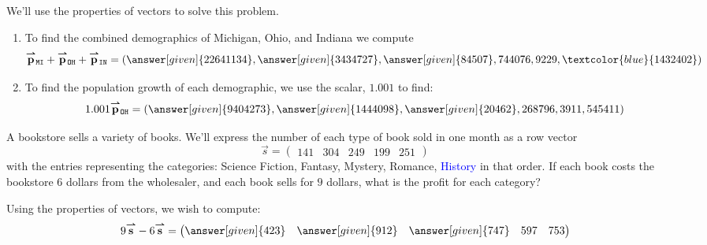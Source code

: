 \documentclass{ximera}
\begin{document}
\begin{example}
\begin{explanation}
  We'll use the properties of vectors to solve this problem.
  \begin{enumerate}
  \item To find the combined demographics of Michigan, Ohio, and
    Indiana we compute
    \[
    \vec{p}_{\texttt{MI}} + \vec{p}_{\texttt{OH}} + \vec{p}_{\texttt{IN}} = \left(\answer[given]{22641134},\answer[given]{3434727},\answer[given]{84507},744076,9229,\textcolor{blue}{1432402}\right)
    \]
  \item To find the population growth of each demographic, we use the scalar, $1.001$ to find:
    \[
    1.001 \vec{p}_{\texttt{OH}} =\left(\answer[given]{9404273},\answer[given]{1444098},\answer[given]{20462},268796,3911,545411 \right)
    \]
  \end{enumerate}
\end{explanation}
\end{example}



\begin{example}
  A bookstore sells a variety of books. We'll express the number of
  each type of book sold in one month as a row vector
  \[
  \vec{s} = \begin{pmatrix}141 & 304 & 249 & 199 & 251 \end{pmatrix}
  \]
  with the entries representing the categories: Science Fiction,
  Fantasy, Mystery, Romance, \textcolor{blue}{History} in that order.  If each book
  costs the bookstore $6$ dollars from the wholesaler, and each book sells
  for $9$ dollars, what is the profit for each category?
  \begin{explanation}
    Using the properties of vectors, we wish to compute:
    \[
    9\vec{s}-6\vec{s} = \begin{pmatrix} \answer[given]{423} & \answer[given]{912} & \answer[given]{747} & 597 & 753 \end{pmatrix}
    \]
  \end{explanation}
\end{example}
\end{document}
